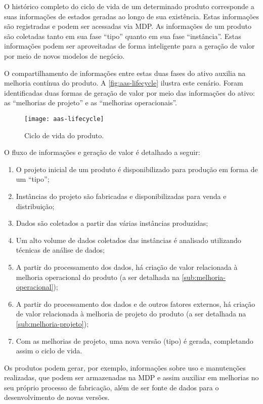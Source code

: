 O histórico completo do ciclo de vida de um determinado produto corresponde a suas informações de estados geradas ao longo de sua existência. Estas informações são registradas e podem ser acessadas via MDP. As informações de um produto são coletadas tanto em sua fase ``tipo'' quanto em sua fase ``instância''. Estas informações podem ser aproveitadas de forma inteligente para a geração de valor por meio de novos modelos de negócio.

O compartilhamento de informações entre estas duas fases do ativo auxilia na melhoria contínua do produto. A \autoref{fig:aas-lifecycle} ilustra este cenário. Foram identificadas duas formas de geração de valor por meio das informações do ativo: as ``melhorias de projeto'' e as ``melhorias operacionais''.

\begin{figure}[htb]
	\centering
	\texttt{[image: aas-lifecycle]}
	\caption{Ciclo de vida do produto.}
	\label{fig:aas-lifecycle}
\end{figure}

O fluxo de informações e geração de valor é detalhado a seguir:

\begin{enumerate}[label=(\alph*)]
	\item O projeto inicial de um produto é disponibilizado para produção em forma de um ``tipo'';
	\item Instâncias do projeto são fabricadas e disponibilizadas para venda e distribuição;
	\item Dados são coletados a partir das várias instâncias produzidas;
	\item Um alto volume de dados coletados das instâncias é analisado utilizando técnicas de análise de dados;
	\item A partir do processamento dos dados, há criação de valor relacionada à melhoria operacional do produto (a ser detalhada na \autoref{sub:melhoria-operacional});
	\item A partir do processamento dos dados e de outros fatores externos, há criação de valor relacionada à melhoria de projeto do produto (a ser detalhada na \autoref{sub:melhoria-projeto});
	\item Com as melhorias de projeto, uma nova versão (tipo) é gerada, completando assim o ciclo de vida.
\end{enumerate}

Os produtos podem gerar, por exemplo, informações sobre uso e manutenções realizadas, que podem ser armazenadas na MDP e assim auxiliar em melhorias no seu próprio processo de fabricação, além de ser fonte de dados para o desenvolvimento de novas versões.

